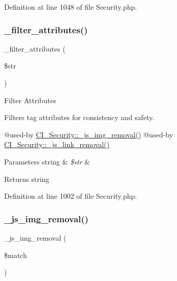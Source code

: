 Definition at line 1048 of file Security.\+php.

\mbox{\label{class_c_i___security_aa385a9c7527f5eece656b9cac73979d3}} 
\subsubsection{\texorpdfstring{\_filter\_attributes()}{\_filter\_attributes()}}
{\footnotesize\ttfamily \+\_\+filter\+\_\+attributes (\begin{DoxyParamCaption}\item[{}]{\$str }\end{DoxyParamCaption})\hspace{0.3cm}{\ttfamily [protected]}}

Filter Attributes

Filters tag attributes for consistency and safety.

@used-\/by \mbox{\hyperlink{class_c_i___security_a5c5e91dc8e3df0174e4e074dd375a8db}{C\+I\+\_\+\+Security\+::\+\_\+js\+\_\+img\+\_\+removal()}} @used-\/by \mbox{\hyperlink{class_c_i___security_a6b1744acaf85e05c65ab17242dea4f06}{C\+I\+\_\+\+Security\+::\+\_\+js\+\_\+link\+\_\+removal()}} 
\begin{DoxyParams}[1]{Parameters}
string & {\em \$str} & \\
\hline
\end{DoxyParams}
\begin{DoxyReturn}{Returns}
string 
\end{DoxyReturn}


Definition at line 1002 of file Security.\+php.

\mbox{\label{class_c_i___security_a5c5e91dc8e3df0174e4e074dd375a8db}} 
\subsubsection{\texorpdfstring{\_js\_img\_removal()}{\_js\_img\_removal()}}
{\footnotesize\ttfamily \+\_\+js\+\_\+img\+\_\+removal (\begin{DoxyParamCaption}\item[{}]{\$match }\end{DoxyParamCaption})\hspace{0.3cm}{\ttfamily [protected]}}

